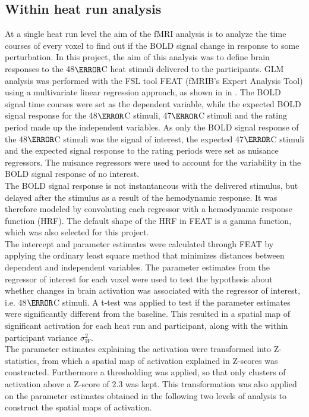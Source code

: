 \subsection{Within heat run analysis}
At a single heat run level the aim of the fMRI analysis is to analyze the time courses of every voxel to find out if the BOLD signal change in response to some perturbation. In this project, the aim of this analysis was to define brain responses to the 48$\degree$C heat stimuli delivered to the participants. GLM analysis was performed with the FSL tool FEAT (fMRIB’s Expert Analysis Tool) using a multivariate linear regression approach, as shown in  in . The BOLD signal time courses were set as the dependent variable, while the expected BOLD signal response for the 48$\degree$C stimuli, 47$\degree$C stimuli and the rating period made up the independent variables. As only the BOLD signal response of the 48$\degree$C stimuli was the signal of interest, the expected 47$\degree$C stimuli and the expected signal response to the rating periods were set as nuisance regressors. The nuisance regressors were used to account for the variability in the BOLD signal response of no interest. \\
The BOLD signal response is not instantaneous with the delivered stimulus, but delayed after the stimulus as a result of the hemodynamic response. It was therefore modeled by convoluting each regressor with a hemodynamic response function (HRF). The default shape of the HRF in FEAT is a  gamma function, which was also selected for this project. \\
The intercept and parameter estimates were calculated through FEAT by applying the ordinary least square method that minimizes distances between dependent and independent variables. The parameter estimates from the regressor of interest for each voxel were used to test the hypothesis about whether changes in brain activation was associated with the regressor of interest, i.e. 48$\degree$C stimuli. A t-test was applied to test if the parameter estimates were significantly different from the baseline. This resulted in a spatial map of significant activation for each heat run and participant, along with the within participant variance $\sigma_{W}^{2}$. \\
The parameter estimates explaining the activation were transformed into Z-statistics, from which a spatial map of activation explained in Z-scores was constructed. Furthermore a thresholding was applied, so that only clusters of activation above a Z-score of 2.3 was kept. This transformation was also applied on the parameter estimates obtained in the following two levels of analysis to construct the spatial maps of activation. 

